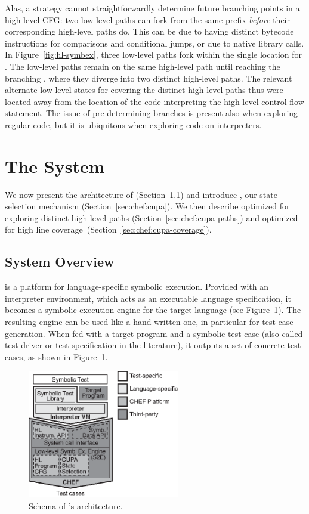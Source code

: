 Alas, a strategy cannot straightforwardly determine future branching points in a high-level CFG: two low-level paths can fork from the same prefix \emph{before} their corresponding high-level paths do.  This can be due to having distinct bytecode instructions for comparisons and conditional jumps, or due to native library calls.  
%
In Figure~\ref{fig:hl-symbex}, three low-level paths fork within the single \hlpc location for . The low-level paths remain on the same high-level path until reaching the branching \hlpc, where they diverge into two distinct high-level paths. The relevant alternate low-level states for covering the distinct high-level paths thus were located away from the location of the code interpreting the high-level control flow statement.
%
The issue of pre-determining branches is present also when exploring regular code, but it is ubiquitous when exploring code on interpreters.

\section{The \chef System}

We now present the architecture of \chef (Section~\ref{sec:chef:architecture}) and introduce \cupa, our state selection mechanism (Section~\ref{sec:chef:cupa}). We then describe \cupa optimized for exploring distinct high-level paths (Section~\ref{sec:chef:cupa-paths}) and optimized for high line coverage~(Section~\ref{sec:chef:cupa-coverage}).

\subsection{System Overview}
\label{sec:chef:architecture}

\chef is a platform for language-specific symbolic execution. Provided with an interpreter environment, which acts as an executable language specification, it becomes a symbolic execution engine for the target language (see Figure~\ref{fig:system-arch}).
%
The resulting engine can be used like a hand-written one, in particular for test case generation. When fed with a target program and a symbolic test case (also called test driver or test specification in the literature), it outputs a set of concrete test cases, as shown in Figure~\ref{fig:system-arch}.

\begin{figure}
  \centering
  \includegraphics[width=2.6in]{figures/chef/system-arch}
  \caption{Schema of \chef's architecture.}
  \label{fig:system-arch}
\end{figure}

